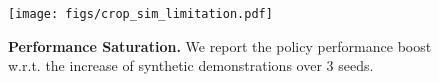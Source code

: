 \begin{figure}
    \centering
    \vspace{-0.3cm}
    \texttt{[image: figs/crop\_sim\_limitation.pdf]}
    \caption{\textbf{Performance Saturation.} We report the policy performance boost w.r.t. the increase of synthetic demonstrations over $3$ seeds.}
    \label{fig:performance-saturation}
    \vspace{-0.3cm}
\end{figure}